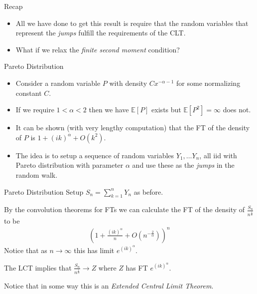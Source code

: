 \documentclass[pdf]{beamer}
\newcommand{\lra}{\longrightarrow}
\begin{document}
\begin{frame}{Recap}
    \begin{itemize}
        \item All we have done to get this result is require that the random variables that represent the \emph{jumps} fulfill the requirements of the CLT.
        \item What if we relax the \emph{finite second moment} condition?
    \end{itemize}
\end{frame}
\begin{frame}{Pareto Distribution}
    \begin{itemize}
        \item Consider a random variable $ P $ with density $ Cx^{-\alpha-1} $ for some normalizing constant $ C $.
        \item If we require $ 1 < \alpha < 2 $ then we have $ \mathbb{E}[P] $ exists but $ \mathbb{E}[P^2] = \infty $ does not.
        \item It can be shown (with very lengthy computation) that the FT of the density of $ P $ is $ 1 + (ik)^\alpha + O(k^2) $.
        \item The idea is to setup a sequence of random variables $ Y_1, \ldots Y_n $, all iid with Pareto distribution with parameter $ \alpha $ and use these as the \emph{jumps} in the random walk.
    \end{itemize}
    
\end{frame}

\begin{frame}{Pareto Distribution}
    Setup $ S_n = \sum_{k=1}^n Y_n $ as before.
    
    By the convolution theorems for FTs we can calculate the FT of the density of $ \frac{S_n}{n^\frac{1}{\alpha}} $ to be
    \begin{align}
        \left( 1 + \frac{(ik)^\alpha}{n} + O(n^{-\frac{2}{\alpha}}) \right)^n
    \end{align}
    Notice that as $ n \lra \infty $ this has limit $ e^{(ik)^\alpha} $.
    
    The LCT implies that $ \frac{S_n}{n^\frac{1}{\alpha}} \lra Z $ where $ Z $ has FT $ e^{(ik)^\alpha} $.
    
    Notice that in some way this is an \emph{Extended Central Limit Theorem}.
\end{frame}
\end{document}
